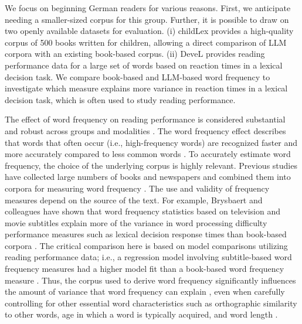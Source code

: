 \documentclass[manuscript]{stjour}
\begin{document}
We focus on beginning German readers for various reasons. First, we anticipate needing a smaller-sized corpus for this group. Further, it is possible to draw on two openly available datasets for evaluation. (i) childLex \citep{schroeder_childlex_2015} provides a high-quality corpus of 500 books written for children, allowing a direct comparison of LLM corpora with an existing book-based corpus. (ii) DeveL \citep{schroter_developmental_2017} provides reading performance data for a large set of words based on reaction times in a lexical decision task. We compare book-based and LLM-based word frequency to investigate which measure explains more variance in reaction times in a lexical decision task, which is often used to study reading performance.

The effect of word frequency on reading performance is considered substantial and robust \citep{brysbaert_impact_2016, brysbaert_word_2018} across groups \citep[e.g.,][]{hawelka_dual-route_2010} and modalities \citep[e.g.,][]{gregorova_access_2023}. The word frequency effect describes that words that often occur (i.e., high-frequency words) are recognized faster and more accurately compared to less common words \citep[i.e., low-frequency words; ][]{adelman_contextual_2006, baayen_demythologizing_2010, brysbaert_impact_2016, gregorova_access_2023, hallin_effects_2018, lieven_input_2010, mcdonald_rethinking_2001, stokes_neighborhood_2010}. To accurately estimate word frequency, the choice of the underlying corpus is highly relevant. Previous studies have collected large numbers of books and newspapers and combined them into corpora for measuring word frequency \citep[e.g.,][]{baayen_celex_1993, heister_dlexdb_2011}. The use and validity of frequency measures depend on the source of the text. For example, Brysbaert and colleagues \citep{brysbaert_word_2011, brysbaert_word_2018} have shown that word frequency statistics based on television and movie subtitles explain more of the variance in word processing difficulty performance measures such as lexical decision response times than book-based corpora \citep[see also][]{chilson_films_2024}. The critical comparison here is based on model comparisons utilizing reading performance data; i.e., a regression model involving subtitle-based word frequency measures had a higher model fit than a book-based word frequency measure \citep[see, e.g.,][]{brysbaert_word_2011}. Thus, the corpus used to derive word frequency significantly influences the amount of variance that word frequency can explain \citep{ferrand_french_2010, keuleers_subtlex-nl_2010, van_heuven_subtlex-uk_2014}, even when carefully controlling for other essential word characteristics such as orthographic similarity to other words, age in which a word is typically acquired, and word length \citep{graf_faktorenanalyse_2005}. 
\end{document}
